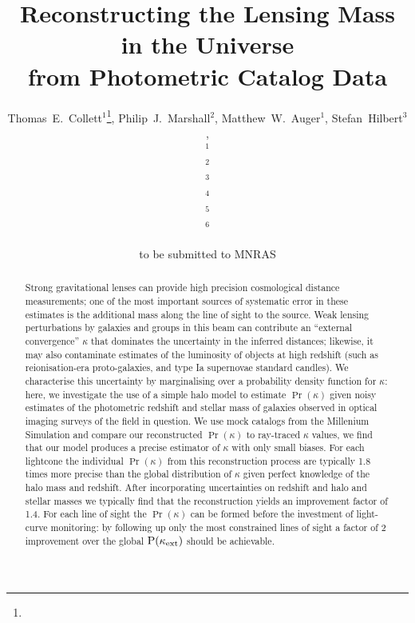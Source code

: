 \documentclass[useAMS,usenatbib]{mn2e}
\title[Line of Sight Mass Reconstruction]
{Reconstructing the Lensing Mass in the Universe \\
from Photometric Catalog Data}
\author[Collett \etal]{%
  Thomas~E.~Collett$^{1}$\thanks{\collettemail},
  Philip~J.~Marshall$^{2}$,
  Matthew~W.~Auger$^{1}$,
  Stefan~Hilbert$^{3}$,
\newauthor{%
  Sherry~H.~Suyu$^{4}$,
  Zachary~Greene$^{4}$,
  Tommaso~Treu$^{4}$\thanks{\packard},
  Vasiliy~Belokurov$^{1}$,}
\newauthor{%
  Christopher~D.~Fassnacht$^{5}$,
  L\`eon~V.~E.~Koopmans$^{6}$,
  Roger~D.~Blandford$^{3}$} 
  \medskip\\
  $^1$\ioa\\
  $^2$\oxford\\
  $^3$\kipac\\
  $^4$\ucsb\\
  $^5$\davis\\
  $^6$\kapteyn
}
\begin{document}
             
\date{to be submitted to MNRAS}
\pagerange{\pageref{firstpage}--\pageref{lastpage}}

\maketitle           

\label{firstpage}


\begin{abstract} 


Strong gravitational lenses can provide high precision cosmological distance
measurements; one of the most important sources of systematic error in these
estimates is the additional mass along the line of sight to the source. Weak
lensing perturbations by galaxies and groups in this beam can contribute an ``external
convergence'' $\kappa$ that dominates the  uncertainty in the inferred
distances; likewise, it may also contaminate estimates of the luminosity of
objects at high redshift (such as reionisation-era proto-galaxies, and type Ia
supernovae standard candles).  We characterise this uncertainty by marginalising
over a probability density function for $\kappa$: here, we investigate the use
of a simple halo model to estimate $\Pr(\kappa)$ given noisy estimates of the
photometric redshift and stellar mass of galaxies observed in optical imaging
surveys of the field in question. We use mock catalogs from the Millenium
Simulation and compare our reconstructed $\Pr(\kappa)$ to ray-traced $\kappa$ values,
we find that our model produces a precise estimator of $\kappa$ with only small biases.
For each lightcone the individual $\Pr(\kappa)$ from this reconstruction process are
typically 1.8 times more precise than the global distribution of $\kappa$ given perfect knowledge 
of the halo mass and redshift. After incorporating uncertainties on redshift and halo and stellar masses
we typically find that the reconstruction yields an improvement factor of 1.4. For each line of sight the
 $\Pr(\kappa)$ can be formed before the investment of light-curve monitoring: by following up only the 
most constrained lines of sight a factor of 2 improvement over the global ${\rm P}(\kappa_{\rm ext})$ should be 
achievable.

\end{abstract}

\end{document}
